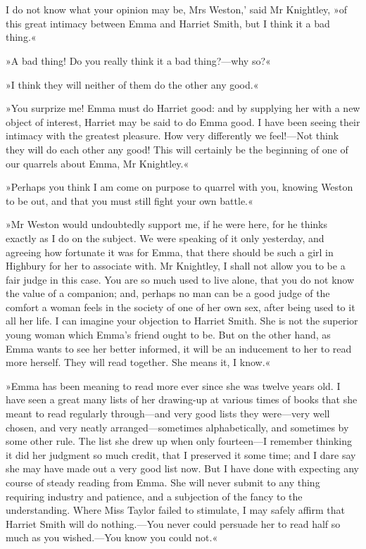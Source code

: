 \chapter[Chapter \thechapter]{}
	
\lettrine[lines=4,lraise=0.3,ante=`]{I}{} do not know what your opinion may be, Mrs Weston,' said Mr Knightley, »of this great intimacy between Emma and Harriet Smith, but I think it a bad thing.«

\zz
»A bad thing! Do you really think it a bad thing?—why so?«

»I think they will neither of them do the other any good.«

»You surprize me! Emma must do Harriet good: and by supplying her with a new object of interest, Harriet may be said to do Emma good. I have been seeing their intimacy with the greatest pleasure. How very differently we feel!—Not think they will do each other any good! This will certainly be the beginning of one of our quarrels about Emma, Mr Knightley.«

»Perhaps you think I am come on purpose to quarrel with you, knowing Weston to be out, and that you must still fight your own battle.«

»Mr Weston would undoubtedly support me, if he were here, for he thinks exactly as I do on the subject. We were speaking of it only yesterday, and agreeing how fortunate it was for Emma, that there should be such a girl in Highbury for her to associate with. Mr Knightley, I shall not allow you to be a fair judge in this case. You are so much used to live alone, that you do not know the value of a companion; and, perhaps no man can be a good judge of the comfort a woman feels in the society of one of her own sex, after being used to it all her life. I can imagine your objection to Harriet Smith. She is not the superior young woman which Emma's friend ought to be. But on the other hand, as Emma wants to see her better informed, it will be an inducement to her to read more herself. They will read together. She means it, I know.«

»Emma has been meaning to read more ever since she was twelve years old. I have seen a great many lists of her drawing-up at various times of books that she meant to read regularly through—and very good lists they were—very well chosen, and very neatly arranged—sometimes alphabetically, and sometimes by some other rule. The list she drew up when only fourteen—I remember thinking it did her judgment so much credit, that I preserved it some time; and I dare say she may have made out a very good list now. But I have done with expecting any course of steady reading from Emma. She will never submit to any thing requiring industry and patience, and a subjection of the fancy to the understanding. Where Miss Taylor failed to stimulate, I may safely affirm that Harriet Smith will do nothing.—You never could persuade her to read half so much as you wished.—You know you could not.«

